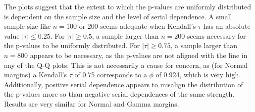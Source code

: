 \documentclass[12pt]{article}
\begin{document}
The plots suggest that the extent to which the p-values are uniformly
distributed is dependent on the sample size and the level of serial dependence.
A small sample size like $n = 100$ or $200$ seems adequate when Kendall's
$\tau$ has an absolute value $|\tau| \leq 0.25$. For $|\tau| \geq 0.5$, 
a sample larger than
$n = 200$ seems necessary for the p-values to be uniformly distributed. For
$|\tau| \geq 0.75$, a sample larger than $n = 800$ appears to be
necessary, as the p-values are not aligned with the line in any of the Q-Q
plots. This is not necessarily a cause for concern, as (for Normal margins)
a Kendall's $\tau$ of 0.75 corresponds to a $\phi$ of 0.924, which is very high.
Additionally, positive serial dependence appears to misalign the distribution
of the p-values more so than negative serial dependences of the same strength.
Results are very similar for Normal and Gamma margins.
\end{document}
